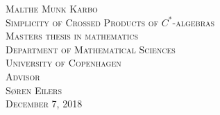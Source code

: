 \clearpage
\thispagestyle{empty}

\begin{titlingpage}
	\vspace*{5.5cm}
	\noindent
	{\large\textsc{Malthe Munk Karbo}}\\[0.5cm]
	{\large\textsc{Simplicity of Crossed Products of $C^*$-algebras}}\\[0.1cm]
	\vfill\noindent
	{\large\textsc{Masters thesis in mathematics}}\\[0.2cm]
	\noindent
	{\large\textsc{Department of Mathematical Sciences}}\\[0.2cm]
	\noindent
	{\large\textsc{University of Copenhagen}}\\[1cm]
	{\large\textsc{Advisor \\[0.2cm] {\Large Søren Eilers }}}\\[1cm]
	{\large\textsc{December 7, 2018}}
	\let\cleardoublepage\clearpage
\end{titlingpage}
\normalfont
\restoregeometry
\cleardoublepage
